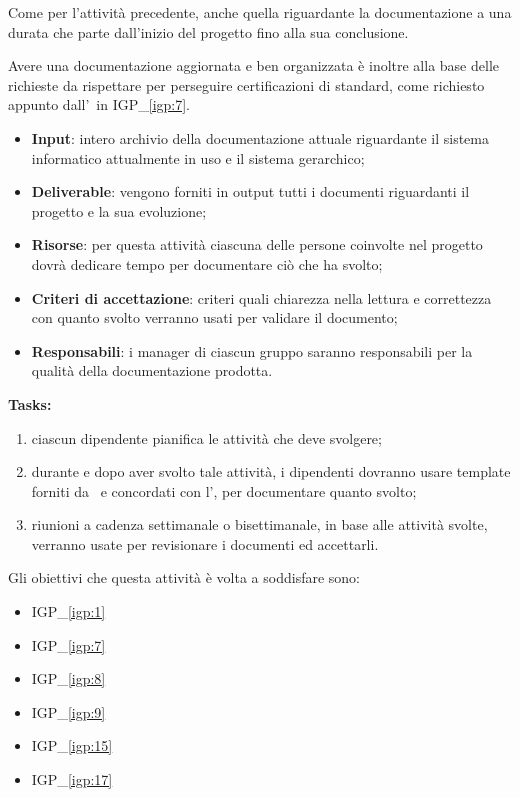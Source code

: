 		Come per l'attività precedente, anche quella riguardante la documentazione a una durata che parte dall'inizio del progetto fino alla sua conclusione.
		
		Avere una documentazione aggiornata e ben organizzata è inoltre alla base delle richieste da rispettare per perseguire certificazioni di standard, come richiesto appunto dall'\istituto~in {\color{pantone}IGP\_\ref{igp:7}}.
		
		\begin{itemize}[noitemsep]
			\renewcommand\labelitemi{--}
			\item \textbf{Input}: intero archivio della documentazione attuale riguardante il sistema informatico attualmente in uso e il sistema gerarchico;
			\item \textbf{Deliverable}: vengono forniti in output tutti i documenti riguardanti il progetto e la sua evoluzione;
			\item \textbf{Risorse}: per questa attività ciascuna delle persone coinvolte nel progetto dovrà dedicare tempo per documentare ciò che ha svolto;
			\item \textbf{Criteri di accettazione}: criteri quali chiarezza nella lettura e correttezza con quanto svolto verranno usati per validare il documento;
			\item \textbf{Responsabili}: i manager di ciascun gruppo saranno responsabili per la qualità della documentazione prodotta.
		\end{itemize}
		
		\textbf{Tasks:}
		\begin{enumerate}[noitemsep]
			\item ciascun dipendente pianifica le attività che deve svolgere;
			\item durante e dopo aver svolto tale attività, i dipendenti dovranno usare template forniti da \azienda~e concordati con l'\istituto, per documentare quanto svolto;
			\item riunioni a cadenza settimanale o bisettimanale, in base alle attività svolte, verranno usate per revisionare i documenti ed accettarli.
		\end{enumerate}
	
		Gli obiettivi che questa attività è volta a soddisfare sono:
		\begin{itemize}[noitemsep]
			\renewcommand\labelitemi{--}
			\item {\color{pantone}IGP\_\ref{igp:1}}
			\item {\color{pantone}IGP\_\ref{igp:7}}
			\item {\color{pantone}IGP\_\ref{igp:8}}
			\item {\color{pantone}IGP\_\ref{igp:9}}
			\item {\color{pantone}IGP\_\ref{igp:15}}
			\item {\color{pantone}IGP\_\ref{igp:17}}
		\end{itemize}


